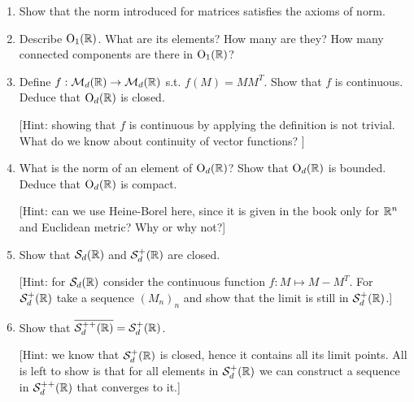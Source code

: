 \documentclass[12pt,a4paper]{article}
\newcommand{\Tailperso}[1]{%
\vfill	
\vskip2ex\noindent
\hrule
\vskip2ex\noindent
{\small
Informations générales, séries, voir \url{https://moodle.unige.ch/course/view.php?id=5641}}
\vskip2ex\noindent
\vskip2ex
}
\begin{document}
\begin{enumerate}
\item Show that the norm introduced for matrices satisfies the axioms of norm.
\item Describe $\operatorname{O}_1(\mathbb{R})$. What are its elements? How many are they? How many connected components are there in $\operatorname{O}_1(\mathbb{R})$?
\item Define $f:\mathcal{M}_d(\mathbb{R})\to \mathcal{M}_d(\mathbb{R})$ s.t. $f(M)=MM^T$. Show that $f$ is continuous. Deduce that $\operatorname{O}_d(\mathbb{R})$ is closed.

[Hint: showing that $f$ is continuous by applying the definition is not trivial. What do we know about continuity of vector functions? ]
\item What is the norm of an element of $\operatorname{O}_d(\mathbb{R})$? Show that $\operatorname{O}_d(\mathbb{R})$ is bounded. Deduce that $\operatorname{O}_d(\mathbb{R})$ is compact.

[Hint: can we use Heine-Borel here, since it is given in the book only for $\mathbb{R}^n$ and Euclidean metric? Why or why not?]
\item Show that $\mathcal{S}_d(\mathbb{R})$ and $\mathcal{S}_d^+(\mathbb{R})$ are closed. 

[Hint: for $\mathcal{S}_d(\mathbb{R})$ consider the continuous function $f\colon M\mapsto M-M^T$. For $\mathcal{S}_d^+(\mathbb{R})$ take a sequence $(M_n)_n$ and show that the limit is still in $\mathcal{S}_d^+(\mathbb{R})$.]
\item Show that $\overline{\mathcal{S}_d^{++}(\mathbb{R})}=\mathcal{S}_d^+(\mathbb{R})$.

[Hint: we know that $\mathcal{S}_d^+(\mathbb{R})$ is closed, hence it contains all its limit points. All is left to show is that for all elements in $\mathcal{S}_d^+(\mathbb{R})$ we can construct a sequence in $\mathcal{S}_d^{++}(\mathbb{R})$ that converges to it.]
\end{enumerate}




\solution{

}






 
\end{document}
